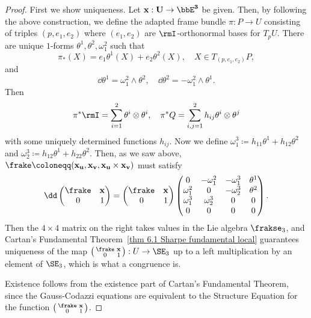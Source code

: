 \begin{proof}
    First we show uniqueness. Let $\bf{x}:U\to \bbE^3$ be given. Then, by following the above construction, we define the adapted frame bundle $\pi:P\to U$ consisting of triples $(p,e_1,e_2)$ where $(e_1,e_2)$ are $\rmI$-orthonormal bases for $T_p U$. There are unique $1$-forms $\theta^1,\theta^2,\omega_1^2$ such that 
    \[\pi_\ast(X)=e_1\theta^1(X)+e_2\theta^2(X),\quad X\in T_{(p,e_1,e_2)}P,\]
    and
    \[\dd\theta^1=\omega_1^2\wedge \theta^2,\quad \dd\theta^2=-\omega_1^2\wedge\theta^1.\]
    Then 
    \[\pi^\ast\rmI=\sum_{i=1}^2\theta^i\otimes\theta^i,\quad \pi^\ast Q=\sum_{i,j=1}^2 h_{ij}\theta^i\otimes\theta^j\]
    with some uniquely determined functions $h_{ij}$. Now we define $\omega_1^3\coloneqq h_{11}\theta^1+h_{12}\theta^2$ and $\omega_2^3\coloneqq h_{12}\theta^1+h_{22}\theta^2$. Then, as we saw above, $\frake\coloneqq(\bf{x}_u,\bf{x}_v,\bf{x}_u\times \bf{x}_v)$ must satisfy 
    \[\dd \begin{pmatrix}
        \frake & \bf{x}\\
        0& 1
    \end{pmatrix}=\begin{pmatrix}
        \frake & \bf{x}\\
        0& 1
    \end{pmatrix}
    \begin{pmatrix}
        0 & -\omega_1^2 & -\omega_1^3& \theta^1\\
        \omega_1^2 & 0 & -\omega_2^3 & \theta^2\\
        \omega_1^3 & \omega_2^3 & 0 & 0\\
        0 & 0& 0& 0
    \end{pmatrix}.
    \]
    Then the $4\times 4$ matrix on the right takes values in the Lie algebra $\frakse_3$, and Cartan's Fundamental Theorem~\ref{thm 6.1 Sharpe fundamental local} guarantees uniqueness of the map $\left(\begin{smallmatrix}
        \frake & \bf{x}\\
        0& 1
    \end{smallmatrix}\right): U\to \SE_3$ up to a left multiplication by an element of $\SE_3$, which is what a congruence is.

    Existence follows from the existence part of Cartan's Fundamental Theorem, since the Gauss-Codazzi equations are equivalent to the Structure Equation for the function $\left(\begin{smallmatrix}
        \frake & \bf{x}\\
        0& 1
    \end{smallmatrix}\right)$.
\end{proof}

